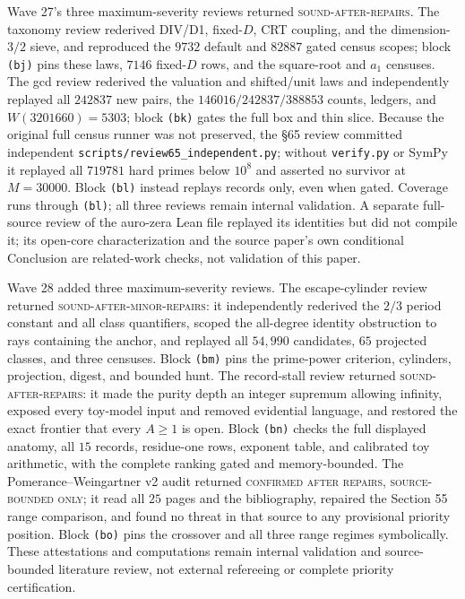 \documentclass[10pt,reqno]{amsart}
\theoremstyle{definition}
\newcommand{\1}{\mathbf 1}
\begin{document}
Wave 27's three maximum-severity reviews returned
\textsc{sound-after-repairs}.  The taxonomy review rederived DIV/D1,
fixed-$D$, CRT coupling, and the dimension-$3/2$ sieve, and reproduced the
$9732$ default and $82887$ gated census scopes; block \texttt{(bj)} pins
these laws, $7146$ fixed-$D$ rows, and the square-root and $a_1$ censuses.
The gcd review rederived the valuation and shifted/unit laws and independently
replayed all $242837$ new pairs, the $146016/242837/388853$ counts, ledgers,
and $W(3201660)=5303$; block \texttt{(bk)} gates the full box and thin slice.
Because the original full census runner was not preserved, the §65 review
committed independent \texttt{scripts/review65\_independent.py}; without
\texttt{verify.py} or SymPy it replayed all $719781$ hard primes below
$10^8$ and asserted no survivor at $M=30000$.  Block \texttt{(bl)} instead
replays records only, even when gated.  Coverage runs through \texttt{(bl)};
all three reviews remain internal validation.  A separate full-source
review of the auro-zera Lean file
replayed its identities but did not compile it; its open-core
characterization and the source paper's own conditional Conclusion are
related-work checks, not validation of this paper.

Wave 28 added three maximum-severity reviews.  The escape-cylinder review
returned \textsc{sound-after-minor-repairs}: it independently rederived the
$2/3$ period constant and all class quantifiers, scoped the all-degree
identity obstruction to rays containing the anchor, and replayed all
$54{,}990$ candidates, $65$ projected classes, and three censuses.  Block
\texttt{(bm)} pins the prime-power criterion, cylinders, projection, digest,
and bounded hunt.  The record-stall review returned
\textsc{sound-after-repairs}: it made the purity depth an integer supremum
allowing infinity, exposed every toy-model input and removed evidential
language, and restored the exact frontier that every $A\geq1$ is open.
Block \texttt{(bn)} checks the full displayed anatomy, all $15$ records,
residue-one rows, exponent table, and calibrated toy arithmetic, with the
complete ranking gated and memory-bounded.  The Pomerance--Weingartner v2
audit returned \textsc{confirmed after repairs, source-bounded only}; it
read all $25$ pages and the bibliography, repaired the Section 55 range
comparison, and found no threat in that source to any provisional priority
position.  Block \texttt{(bo)} pins the crossover and all three range
regimes symbolically.  These attestations and computations remain internal
validation and source-bounded literature review, not external refereeing or
complete priority certification.
\end{document}
